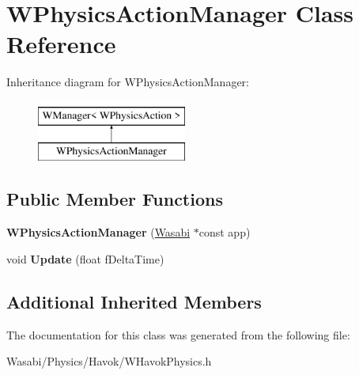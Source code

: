 \hypertarget{class_w_physics_action_manager}{}\section{W\+Physics\+Action\+Manager Class Reference}
\label{class_w_physics_action_manager}
Inheritance diagram for W\+Physics\+Action\+Manager\+:\begin{figure}[H]
\begin{center}
\leavevmode
\includegraphics[height=2.000000cm]{class_w_physics_action_manager}
\end{center}
\end{figure}
\subsection*{Public Member Functions}
\begin{DoxyCompactItemize}
\item 
{\bfseries W\+Physics\+Action\+Manager} (\hyperlink{class_wasabi}{Wasabi} $\ast$const app)\hypertarget{class_w_physics_action_manager_ab252a65d09eeab89fc0bbf4d6024e80c}{}\label{class_w_physics_action_manager_ab252a65d09eeab89fc0bbf4d6024e80c}

\item 
void {\bfseries Update} (float f\+Delta\+Time)\hypertarget{class_w_physics_action_manager_a33c859ac1c3e33377247f3a48fc54d01}{}\label{class_w_physics_action_manager_a33c859ac1c3e33377247f3a48fc54d01}

\end{DoxyCompactItemize}
\subsection*{Additional Inherited Members}


The documentation for this class was generated from the following file\+:\begin{DoxyCompactItemize}
\item 
Wasabi/\+Physics/\+Havok/W\+Havok\+Physics.\+h\end{DoxyCompactItemize}
